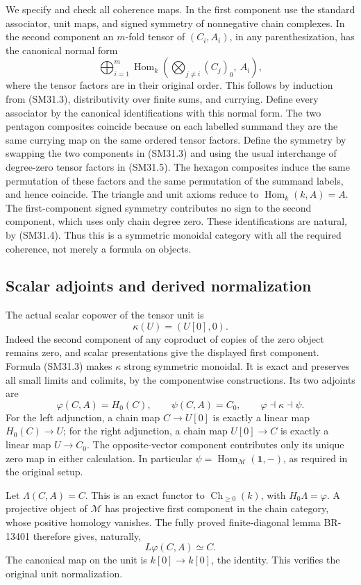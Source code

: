 We specify and check all coherence maps.  In the first component
use the standard associator, unit maps, and signed symmetry of
nonnegative chain complexes.  In the second component an
\(m\)-fold tensor of \((C_i,A_i)\), in any parenthesization,
has the canonical normal form
\[
 \bigoplus_{i=1}^m
  \operatorname{Hom}_k\left(
      \bigotimes_{j\ne i}(C_j)_0,\ A_i\right),             \tag{SM31.5}
\]
where the tensor factors are in their original order.
This follows by induction from (SM31.3), distributivity over
finite sums, and currying.  Define every associator by the
canonical identifications with this normal form.  The two
pentagon composites coincide because on each labelled summand
they are the same currying map on the same ordered tensor
factors.  Define the symmetry by swapping the two components
in (SM31.3) and using the usual interchange of degree-zero
tensor factors in (SM31.5).  The hexagon composites induce the
same permutation of these factors and the same permutation
of the summand labels, and hence coincide.  The triangle and
unit axioms reduce to \(\operatorname{Hom}_k(k,A)=A\).
The first-component signed symmetry contributes no sign to
the second component, which uses only chain degree zero.
These identifications are natural, by (SM31.4).
Thus this is a symmetric monoidal category with all the
required coherence, not merely a formula on objects.

\subsection{Scalar adjoints and derived normalization}
The actual scalar copower of the tensor unit is
\[
 \kappa(U)=(U[0],0).
\]
Indeed the second component of any coproduct of copies of the
zero object remains zero, and scalar presentations give the
displayed first component.  Formula (SM31.3) makes \(\kappa\)
strong symmetric monoidal.  It is exact and preserves all
small limits and colimits, by the componentwise constructions.
Its two adjoints are
\[
 \varphi(C,A)=H_0(C),\qquad
 \psi(C,A)=C_0,
 \qquad \varphi\dashv\kappa\dashv\psi.                    \tag{SM31.6}
\]
For the left adjunction, a chain map \(C\to U[0]\) is exactly
a linear map \(H_0(C)\to U\); for the right adjunction, a
chain map \(U[0]\to C\) is exactly a linear map \(U\to C_0\).
The opposite-vector component contributes only its unique
zero map in either calculation.  In particular
\(\psi=\operatorname{Hom}_{\mathcal M}(\mathbf1,-)\),
as required in the original setup.

Let \(\Lambda(C,A)=C\).  This is an exact functor to
\(\operatorname{Ch}_{\ge0}(k)\), with \(H_0\Lambda=\varphi\).
A projective object of \(\mathcal M\) has projective first
component in the chain category, whose positive homology
vanishes.  The fully proved finite-diagonal lemma BR-13401
therefore gives, naturally,
\[
                     L\varphi(C,A)\simeq C.                \tag{SM31.7}
\]
The canonical map on the unit is \(k[0]\to k[0]\), the
identity.  This verifies the original unit normalization.

